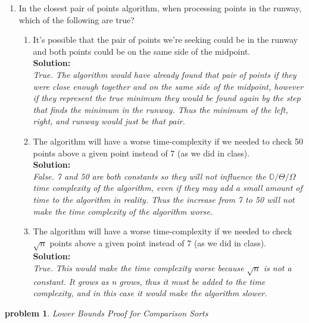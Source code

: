 \documentclass[10pt]{article}
\newtheorem{problem}{\sc\color{cit}problem}
\begin{document}
\begin{enumerate}
        \item In the closest pair of points algorithm, when processing points in the runway, which of the following are true?
    		\begin{enumerate} 
    		\item It's possible that the pair of points we're seeking could be in the runway and both points could be on the same side of the midpoint. \\
    		\textbf{Solution:} \\
            \emph{True. The algorithm would have already found that pair of points if they were close enough together and on the same side of the midpoint, however if they represent the true minimum they would be found again by the step that finds the minimum in the runway. Thus the minimum of the left, right, and runway would just be that pair.}
   		    \item The algorithm will have a worse time-complexity if we needed to check 50 points above a given point instead of 7 (as we did in class). \\
   		    \textbf{Solution:} \\
            \emph{False. 7 and 50 are both constants so they will not influence the $\mathbb{O}/\Theta/\Omega$ time complexity of the algorithm, even if they may add a small amount of time to the algorithm in reality. Thus the increase from 7 to 50 will not make the time complexity of the algorithm worse.}
       		\item The algorithm will have a worse time-complexity if we needed to check $\sqrt{n}$ points above a given point instead of 7 (as we did in class). \\
       		\textbf{Solution:} \\
            \emph{True. This would make the time complexity worse because $\sqrt{n}$ is not a constant. It grows as n grows, thus it must be added to the time complexity, and in this case it would make the algorithm slower.}
    		\end{enumerate} 
    \end{enumerate} 


\begin{problem} Lower Bounds Proof for Comparison Sorts \end{problem}
\end{document}
